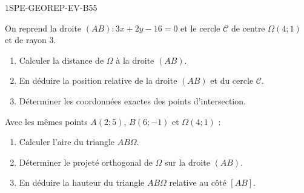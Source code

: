 \begin{evaluation}{1SPE-GEOREP-EV-B}{55}


On reprend la droite $(AB) : 3x + 2y - 16 = 0$ et le cercle $\mathcal{C}$ de centre $\Omega(4 ; 1)$ et de rayon $3$.

\begin{enumerate}
  \item Calculer la distance de $\Omega$ à la droite $(AB)$.
  \item En déduire la position relative de la droite $(AB)$ et du cercle $\mathcal{C}$.
  \item Déterminer les coordonnées exactes des points d'intersection.
\end{enumerate}



Avec les mêmes points $A(2 ; 5)$, $B(6 ; -1)$ et $\Omega(4 ; 1)$ :

\begin{enumerate}
  \item Calculer l'aire du triangle $AB\Omega$.
  \item Déterminer le projeté orthogonal de $\Omega$ sur la droite $(AB)$.
  \item En déduire la hauteur du triangle $AB\Omega$ relative au côté $[AB]$.
\end{enumerate}

\end{evaluation}
